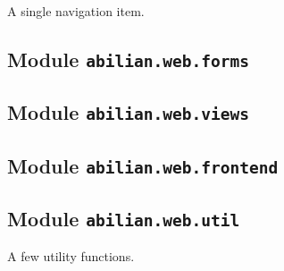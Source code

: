 \documentclass[a4paper,12pt,english]{sphinxmanual}
\begin{document}
\begin{fulllineitems}
\end{fulllineitems}


\begin{fulllineitems}
\label{api:abilian.web.nav.NavItem}
A single navigation item.

\begin{fulllineitems}
\label{api:abilian.web.nav.NavItem.divider}
\end{fulllineitems}


\begin{fulllineitems}
\label{api:abilian.web.nav.NavItem.path}
\end{fulllineitems}


\begin{fulllineitems}
\label{api:abilian.web.nav.NavItem.status}
\end{fulllineitems}


\end{fulllineitems}



\subsection{Module \texttt{abilian.web.forms}}
\label{api:module-abilian-web-forms}

\subsection{Module \texttt{abilian.web.views}}
\label{api:module-abilian-web-views}

\subsection{Module \texttt{abilian.web.frontend}}
\label{api:module-abilian-web-frontend}

\subsection{Module \texttt{abilian.web.util}}
\label{api:module-abilian.web.util}\label{api:module-abilian-web-util}
A few utility functions.
\end{document}
